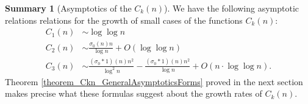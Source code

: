 \documentclass[11pt,reqno,a4letter]{article}
\numberwithin{figure}{section}
\numberwithin{table}{section}
\theoremstyle{plain}
\numberwithin{theorem}{section}
\theoremstyle{definition}
\newtheorem{summary}[theorem]{Summary}
\begin{document}
\begin{summary}[Asymptotics of the $C_k(n)$]
We have the following asymptotic relations relations for the growth of small cases of 
the functions $C_k(n)$: 
\begin{align*} 
C_1(n) & \sim \log\log n \\ 
C_2(n) & \sim \frac{\sigma_0(n) n}{\log n} + O(\log\log n) \\ 
C_3(n) & \sim \frac{(\sigma_0 \ast 1)(n) n^2}{\log^2 n} - 
     \frac{(\sigma_0 \ast 1)(n) n^2}{\log n} + 
     O\left(n \cdot \log\log n\right). 
\end{align*} 
Theorem \ref{theorem_Ckn_GeneralAsymptoticsForms} proved in the next section  
makes precise what these formulas suggest about the growth rates of 
$C_k(n)$. 
\end{summary} 
\end{document}
